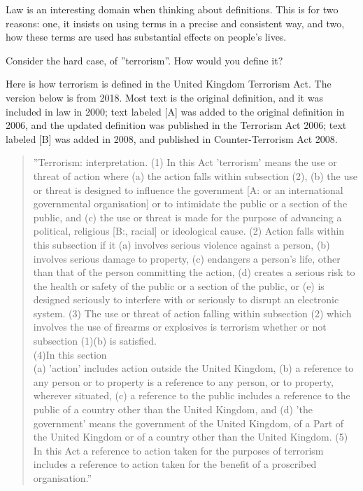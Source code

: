 Law is an interesting domain when thinking about definitions. This is for two reasons: one, it insists on using terms in a precise and consistent way, and two, how these terms are used has substantial effects on people's lives.

Consider the hard case, of ''terrorism''. How would you define it?

Here is how terrorism is defined in the United Kingdom Terrorism Act. The version below is from 2018. Most text is the original definition, and it was included in law in 2000; text labeled [A] was added to the original definition in 2006, and the updated definition was published in the Terrorism Act 2006; text labeled [B] was added in 2008, and published in Counter-Terrorism Act 2008.

\begin{quote}
''Terrorism: interpretation.
(1) In this Act 'terrorism' means the use or threat of action where 
(a) the action falls within subsection (2), 
(b) the use or threat is designed to influence the government [A: or an international governmental organisation] or to intimidate the public or a section of the public, and 
(c) the use or threat is made for the purpose of advancing a political, religious [B:, racial] or ideological cause. 
(2) Action falls within this subsection if it 
(a) involves serious violence against a person, 
(b) involves serious damage to property, 
(c) endangers a person's life, other than that of the person committing the action,
(d) creates a serious risk to the health or safety of the public or a section of the public, or 
(e) is designed seriously to interfere with or seriously to disrupt an electronic system. 
(3) The use or threat of action falling within subsection (2) which involves the use of firearms or explosives is terrorism whether or not subsection (1)(b) is satisfied. \\
(4)In this section \\
(a) 'action' includes action outside the United Kingdom, 
(b) a reference to any person or to property is a reference to any person, or to property, wherever situated, 
(c) a reference to the public includes a reference to the public of a country other than the United Kingdom, and 
(d) 'the government' means the government of the United Kingdom, of a Part of the United Kingdom or of a country other than the United Kingdom. 
(5) In this Act a reference to action taken for the purposes of terrorism includes a reference to action taken for the benefit of a proscribed organisation.'' \cite{uk-terrorism-act}
\end{quote}

